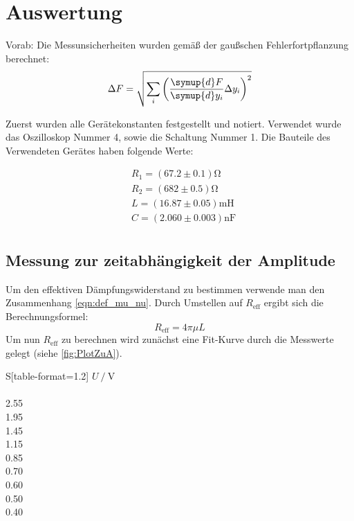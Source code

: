 \section{Auswertung}
\label{sec:Auswertung}
Vorab: Die Messunsicherheiten wurden gemäß der gaußschen Fehlerfortpflanzung berechnet:
\begin{equation}
  \label{eqn:Gauss}
  \Delta F = \sqrt{\sum_i\left(\frac{\symup{d}F}{\symup{d}y_i}\Delta y_i \right)^2}
\end{equation}

Zuerst wurden alle Gerätekonstanten festgestellt und notiert. Verwendet wurde das Oszilloskop Nummer 4, sowie
die Schaltung Nummer 1. Die Bauteile des Verwendeten Gerätes haben folgende Werte:

\begin{align*}
  &R_1 = (67.2 \pm 0.1) \unit{\ohm} \\
  &R_2 = (682 \pm 0.5) \unit{\ohm}  \\
  &L   = (16.87 \pm 0.05) \unit{\milli\henry} \\
  &C   = (2.060 \pm 0.003) \unit{\nano\farad} \\
\end{align*}

\subsection{Messung zur zeitabhängigkeit der Amplitude}
\label{subsec:AuswertungA}

Um den effektiven Dämpfungswiderstand zu bestimmen verwende man den Zusammenhang \eqref{eqn:def_mu_nu}.
Durch Umstellen auf $R_{\text{eff}}$ ergibt sich die Berechnungsformel:
\begin{equation}
  \label{Abklingdauer1}
  R_{\text{eff}} = 4\pi\mu L
\end{equation}
Um nun $R_{\text{eff}}$ zu berechnen wird zunächst eine Fit-Kurve durch die Messwerte gelegt (siehe \autoref{fig:PlotZuA}).

\begin{table}
  \centering
  \caption{Messdaten zur Zeitabhängigkeit der Amplitude. Abgelesen wurdne die positiven Maxima im Abstand einer Periodendauer.}
  \label{tab:Mess1}
  \begin{tabular}{S[table-format=1.2]}
      \toprule
      $U \mathbin{/} \unit{\volt}$ \\
       \\
      2.55 \\
      1.95 \\
      1.45 \\
      1.15 \\
      0.85 \\
      0.70 \\
      0.60 \\
      0.50 \\
      0.40 \\
  \bottomrule 
  \end{tabular}
\end{table}

